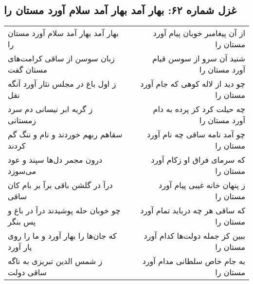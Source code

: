 \begin{center}
\section*{غزل شماره ۶۲: بهار آمد بهار آمد سلام آورد مستان را}
\label{sec:0062}
\begin{longtable}{l p{0.5cm} r}
بهار آمد بهار آمد سلام آورد مستان را
&&
از آن پیغامبر خوبان پیام آورد مستان را
\\
زبان سوسن از ساقی کرامت‌های مستان گفت
&&
شنید آن سرو از سوسن قیام آورد مستان را
\\
ز اول باغ در مجلس نثار آورد آنگه نقل
&&
چو دید از لاله کوهی که جام آورد مستان را
\\
ز گریه ابر نیسانی دم سرد زمستانی
&&
چه حیلت کرد کز پرده به دام آورد مستان را
\\
سقاهم ربهم خوردند و نام و ننگ گم کردند
&&
چو آمد نامه ساقی چه نام آورد مستان را
\\
درون مجمر دل‌ها سپند و عود می‌سوزد
&&
که سرمای فراق او زکام آورد مستان را
\\
درآ در گلشن باقی برآ بر بام کان ساقی
&&
ز پنهان خانه غیبی پیام آورد مستان را
\\
چو خوبان حله پوشیدند درآ در باغ و پس بنگر
&&
که ساقی هر چه درباید تمام آورد مستان را
\\
که جان‌ها را بهار آورد و ما را روی یار آورد
&&
ببین کز جمله دولت‌ها کدام آورد مستان را
\\
ز شمس الدین تبریزی به ناگه ساقی دولت
&&
به جام خاص سلطانی مدام آورد مستان را
\\
\end{longtable}
\end{center}
